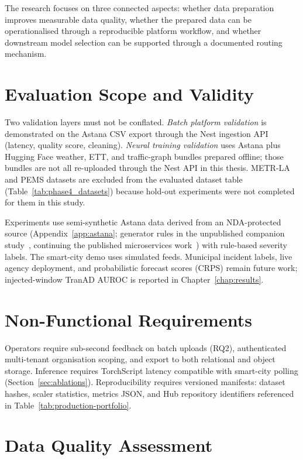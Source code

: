 The research focuses on three connected aspects: whether data preparation improves measurable data quality, whether the prepared data can be operationalised through a reproducible platform workflow, and whether downstream model selection can be supported through a documented routing mechanism.

\section{Evaluation Scope and Validity}
\label{sec:evaluation_scope}

Two validation layers must not be conflated. \emph{Batch platform validation} is demonstrated on the Astana CSV export through the Nest ingestion API (latency, quality score, cleaning). \emph{Neural training validation} uses Astana plus Hugging Face weather, ETT, and traffic-graph bundles prepared offline; those bundles are not all re-uploaded through the Nest API in this thesis. METR-LA and PEMS datasets are excluded from the evaluated dataset table (Table~\ref{tab:phase4_datasets}) because hold-out experiments were not completed for them in this study.

Experiments use semi-synthetic Astana data derived from an NDA-protected source (Appendix~\ref{app:astana}; generator rules in the unpublished companion study~\cite{bakytuly2026architectural}, continuing the published microservices work~\cite{bakytuly2026microservices}) with rule-based severity labels. The smart-city demo uses simulated feeds. Municipal incident labels, live agency deployment, and probabilistic forecast scores (CRPS) remain future work; injected-window TranAD AUROC is reported in Chapter~\ref{chap:results}.

\section{Non-Functional Requirements}

Operators require sub-second feedback on batch uploads (RQ2), authenticated multi-tenant organisation scoping, and export to both relational and object storage. Inference requires TorchScript latency compatible with smart-city polling (Section~\ref{sec:ablations}). Reproducibility requires versioned manifests: dataset hashes, scaler statistics, metrics JSON, and Hub repository identifiers referenced in Table~\ref{tab:production-portfolio}.

\section{Data Quality Assessment}

